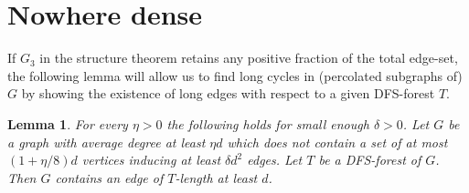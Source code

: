 \documentclass[10pt]{article}
\newtheorem{lemma}[theorem]{Lemma}
\theoremstyle{definition}
\begin{document}
\section{Nowhere dense}
If $G_3$ in the structure theorem retains any positive fraction of the total edge-set, the following lemma will allow us to find long cycles in (percolated subgraphs of) $G$ by showing the existence of long edges with respect to a given DFS-forest $T$.
\begin{lemma}\label{lem: nowhere dense case}
    For every $\eta>0$ the following holds for small enough $\delta>0$. Let $G$ be a graph with average degree at least $\eta d$ which does not contain a set of at most $(1+\eta/8)d$ vertices inducing at least $ \delta d^2$ edges. Let $T$ be a DFS-forest of $G$.
    Then $G$ contains an edge of $T$-length at least $d$.
\end{lemma}
\end{document}
